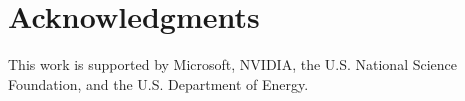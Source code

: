 \documentclass[10pt]{book}
\begin{document}


\chapter*{Acknowledgments}
This work is supported by Microsoft, NVIDIA, the U.S. National Science 
Foundation, and the U.S. Department of Energy.




\end{document}
